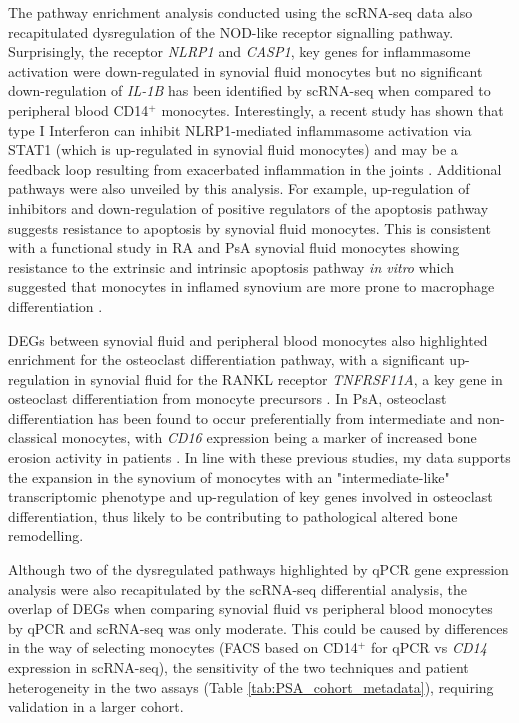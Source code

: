 The pathway enrichment analysis conducted using the scRNA-seq data also recapitulated dysregulation of the NOD-like receptor signalling pathway. Surprisingly, the receptor \textit{NLRP1} and \textit{CASP1}, key genes for inflammasome activation were down-regulated in synovial fluid monocytes but no significant down-regulation of \textit{IL-1B}  has been identified by scRNA-seq when compared to peripheral blood CD14$^+$ monocytes.  Interestingly, a recent study has shown that type I Interferon can inhibit NLRP1-mediated inflammasome activation via STAT1 (which is up-regulated in synovial fluid monocytes) and may be a feedback loop resulting from exacerbated inflammation in the joints \parencite{Guarda2011}. Additional pathways were also unveiled by this analysis. For example, up-regulation of inhibitors and down-regulation of positive regulators of the apoptosis pathway suggests resistance to apoptosis by synovial fluid monocytes. This is consistent with a functional study in RA and PsA synovial fluid monocytes showing resistance to the extrinsic and intrinsic apoptosis pathway \textit{in vitro} which suggested that monocytes in inflamed synovium are more prone to macrophage differentiation \parencite{Rajasekhar2017,Srivastava2010}. 

DEGs between synovial fluid and peripheral blood monocytes also highlighted enrichment for the osteoclast differentiation pathway, with a significant up-regulation in synovial fluid for the  RANKL receptor \textit{TNFRSF11A}, a key gene in osteoclast differentiation from monocyte precursors \parencite{Mensah2008}. In PsA, osteoclast differentiation has been found to occur preferentially from intermediate and non-classical monocytes, with \textit{CD16} expression being a marker of increased bone erosion activity in patients \parencite{Chiu2010}. In line with these previous studies, my data supports the expansion in the synovium of monocytes with an "intermediate-like" transcriptomic phenotype and up-regulation of key genes involved in osteoclast differentiation, thus likely to be contributing to pathological altered bone remodelling.

Although two of the dysregulated pathways highlighted by qPCR gene expression analysis were also recapitulated by the scRNA-seq differential analysis, the overlap of DEGs when comparing synovial fluid vs peripheral blood monocytes by qPCR and scRNA-seq was only moderate. %
 This could be caused by differences in the way of selecting monocytes (FACS based on CD14$^+$ for qPCR vs \textit{CD14} expression in scRNA-seq), the sensitivity of the two techniques and patient heterogeneity in the two assays (Table \ref{tab:PSA_cohort_metadata}), requiring validation in a larger cohort.



